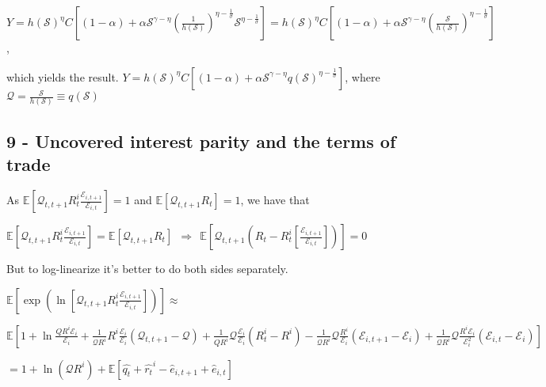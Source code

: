 \documentclass[
]{article}
\begin{document}
\(\displaystyle Y = h(\mathcal{S})^{\eta}C \left[ (1-\alpha) + \alpha \mathcal{S}^{\gamma-\eta} \left( \frac{1}{h(\mathcal{S})} \right)^{\eta-\frac{1}{\sigma}} \mathcal{S} ^{\eta-\frac{1}{\sigma}} \right] = h(\mathcal{S})^{\eta}C \left[ (1-\alpha) + \alpha \mathcal{S}^{\gamma-\eta} \left( \frac{\mathcal{S}}{h(\mathcal{S})} \right)^{\eta-\frac{1}{\sigma}} \right]\),

which yields the result.
\(\displaystyle Y= h(\mathcal{S})^{\eta}C \left[ (1-\alpha) + \alpha \mathcal{S}^{\gamma-\eta} q(\mathcal{S})^{\eta-\frac{1}{\sigma}} \right]\),
where
\(\displaystyle \mathcal{Q}=\frac{\mathcal{S}}{h(\mathcal{S})} \equiv q(\mathcal{S})\)

\hypertarget{uncovered-interest-parity-and-the-terms-of-trade}{%
\subsection{9 - Uncovered interest parity and the terms of
trade}\label{uncovered-interest-parity-and-the-terms-of-trade}}

As
\(\displaystyle \mathbb{E}\left[ \mathcal{Q}_{t,t+1} R_t^i \frac{\mathcal{E}_{i,t+1} }{\mathcal{E}_{i,t} }\right] = 1\)
and
\(\displaystyle \mathbb{E}\left[ \mathcal{Q}_{t,t+1} R_t \right] = 1\),
we have that

\(\displaystyle \mathbb{E}\left[ \mathcal{Q}_{t,t+1} R_t^i \frac{\mathcal{E}_{i,t+1} }{\mathcal{E}_{i,t} }\right] = \displaystyle \mathbb{E}\left[ \mathcal{Q}_{t,t+1} R_t \right] \ \ \Rightarrow \ \  \mathbb{E}\left[ \mathcal{Q}_{t,t+1} \left(R_t-R_t^i \left[ \frac{\mathcal{E}_{i,t+1} }{\mathcal{E}_{i,t} } \right] \right) \right] = 0\)

But to log-linearize it's better to do both sides separately.

\(\displaystyle \mathbb{E} \left[\exp \left( \ln \left[ \mathcal{Q}_{t,t+1} R_t^i \frac{\mathcal{E}_{i,t+1} }{\mathcal{E}_{i,t} }\right] \right) \right] \approx\)

\(\displaystyle \mathbb{E} \left[ 1 + \ln\frac{Q R^i \mathcal{E}_{i}}{\mathcal{E}_{i}}+\frac{1}{\mathcal{Q}R^i}R^i \frac{ \mathcal{E}_{i}}{\mathcal{E}_{i}}(\mathcal{Q}_{t,t+1}-\mathcal{Q}) + \frac{1}{QR^i}\mathcal{Q} \frac{ \mathcal{E}_{i}}{\mathcal{E}_{i}}(R_t^i-R^i) - \frac{1}{\mathcal{Q}R^i}\mathcal{Q} \frac{R^i}{\mathcal{E}_{i}}(\mathcal{E}_{i,t+1}-\mathcal{E}_i) + \frac{1}{\mathcal{Q}R^i}\mathcal{Q} \frac{R^i \mathcal{E}_{i}}{\mathcal{E}_{i}^2}(\mathcal{E}_{i,t}-\mathcal{E}_i) \right]\)

\(\displaystyle = 1+ \ln(\mathcal{Q}R^i) + \mathbb{E} \left[ \hat{q_t}+\hat{r_t}^i - \hat{e}_{i,t+1}+\hat{e}_{i,t}\right]\)
\end{document}
